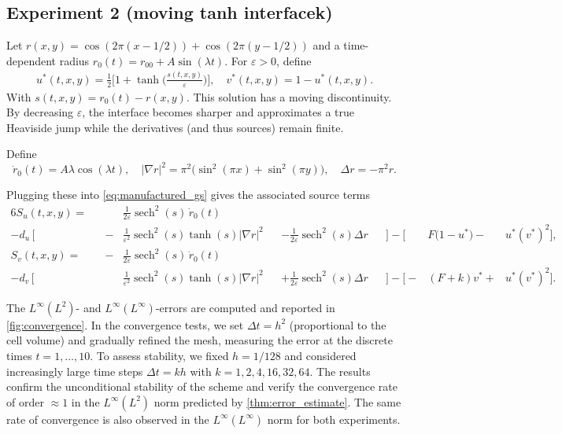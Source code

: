 \documentclass[11pt, a4paper]{amsart}
\DeclareMathOperator{\sech}{sech}
\numberwithin{equation}{section}
\begin{document}
	\subsection*{Experiment 2 (moving tanh interfacek)}
	Let $r(x, y) = \cos(2\pi (x-1/2)) + \cos(2\pi (y-1/2))$ and a time-dependent radius $r_0(t) = r_{00} + A\sin(\lambda t)$. For $\varepsilon >0$, define
	\begin{align*}
		u^*(t,x,y) = \frac12\bigg[1 + \tanh\bigg(\frac{s(t,x,y)}{\varepsilon}\bigg)\bigg],
		\quad
		v^*(t,x,y) = 1 - u^*(t,x,y).
	\end{align*}
	With $s(t,x,y) = r_0(t) - r(x,y)$. This solution has a moving discontinuity. By decreasing $\varepsilon$, the interface becomes sharper and approximates a true Heaviside jump while the derivatives (and thus sources) remain finite.	
	
	Define 
	\[
	\dot r_0(t) = A \lambda \cos(\lambda t), \quad\vert\nabla r\vert ^2 = \pi^2 \big( \sin^2(\pi x) + \sin^2(\pi y) \big),
	\quad
	\Delta r = -\pi^2 r.
	\]
	
	Plugging these into \eqref{eq:manufactured_gs} gives the associated source terms
	\begin{alignat*}{6}
		S_u(t,x,y)
		={}&&&\frac{1}{2\varepsilon} \sech^2(s)\,\dot r_0(t)
		\\
		-d_u\, \bigg[&&-&\frac{1}{\varepsilon^2}\sech^2(s)\tanh(s)\vert\nabla r\vert^2
		&&-\frac{1}{2\varepsilon}\sech^2(s)\Delta r
		&&\bigg]
		-\Big[&F\big(1-u^*\big)-&u^*(v^*)^2\Big],
		\\[5pt]
		S_v(t,x,y)
		 ={}&&-&\frac{1}{2\varepsilon} \sech^2(s)\, \dot r_0(t) 
		 \\
		 -d_v\,\bigg[&&&\frac{1}{\varepsilon^2}\sech^2(s)\tanh(s)\vert\nabla r\vert^2
		&&+\frac{1}{2\varepsilon}\sech^2(s)\Delta r&&\bigg]-\Big[-&(F+k)v^*+&u^*(v^*)^2\Big].
	\end{alignat*}
	
The $L^\infty(L^2)$- and $L^\infty(L^\infty)$-errors are computed and reported in \cref{fig:convergence}. In the convergence tests, we set $\Delta t = h^2$ (proportional to the cell volume) and gradually refined the mesh, measuring the error at the discrete times $t = 1,\ldots,10$. To assess stability, we fixed $h = 1/128$ and considered increasingly large time steps $\Delta t = k h$ with $k = 1,2,4,16,32,64$. The results confirm the unconditional stability of the scheme and verify the convergence rate of order $\approx 1$ in the $L^\infty(L^2)$ norm predicted by \cref{thm:error_estimate}. The same rate of convergence is also observed in the $L^\infty(L^\infty)$ norm for both experiments.
\end{document}

